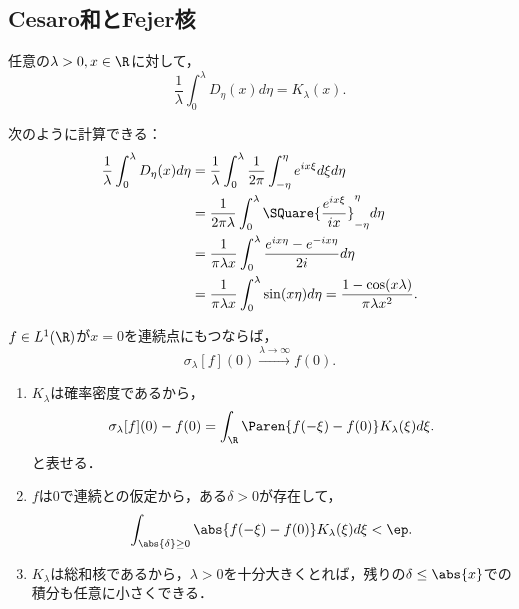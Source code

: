 \documentclass[uplatex,dvipdfmx]{jsreport}
\begin{document}
\subsection{Cesaro和とFejer核}

\begin{proposition}[Fejer核はDirihlet核のCesaro平均である]
    任意の$\lambda>0,x\in\R$に対して，
    \[\frac{1}{\lambda}\int^\lambda_0D_\eta(x)d\eta=K_\lambda(x).\]
\end{proposition}
\begin{Proof}
    次のように計算できる：
    \begin{align*}
        \frac{1}{\lambda}\int^\lambda_0D_\eta(x)d\eta&=\frac{1}{\lambda}\int^\lambda_0\frac{1}{2\pi}\int^\eta_{-\eta}e^{ix\xi}d\xi d\eta\\
        &=\frac{1}{2\pi\lambda}\int^\lambda_0\SQuare{\frac{e^{ix\xi}}{ix}}^\eta_{-\eta}d\eta\\
        &=\frac{1}{\pi\lambda x}\int^\lambda_0\frac{e^{ix\eta}-e^{-ix\eta}}{2i}d\eta\\
        &=\frac{1}{\pi\lambda x}\int^\lambda_0\sin(x\eta)d\eta=\frac{1-\cos(x\lambda)}{\pi\lambda x^2}.
    \end{align*}
\end{Proof}

\begin{proposition}[$\R$上のFejerの定理]
    $f\in L^1(\R)$が$x=0$を連続点にもつならば，
    \[\sigma_\lambda[f](0)\xrightarrow{\lambda\to\infty}f(0).\]
\end{proposition}
\begin{Proof}\mbox{}
    \begin{enumerate}[{Step}1]
        \item $K_\lambda$は確率密度であるから，
        \[\sigma_\lambda[f](0)-f(0)=\int_\R\Paren{f(-\xi)-f(0)}K_\lambda(\xi)d\xi.\]
        と表せる．
        \item $f$は$0$で連続との仮定から，ある$\delta>0$が存在して，
        \[\int_{\abs{\delta}\ge0}\abs{f(-\xi)-f(0)}K_\lambda(\xi)d\xi<\ep.\]
        \item $K_\lambda$は総和核であるから，$\lambda>0$を十分大きくとれば，残りの$\delta\le\abs{x}$での積分も任意に小さくできる．
    \end{enumerate}
\end{Proof}
\end{document}
